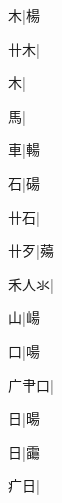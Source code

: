 \begin{multicols}{2}
{{\cjk{}{\cnsym{}　}{\cnsym{}　}木}|{\cjk{}楊}\par
{\cjk{}{\cnsym{}　}卄木}|{}\par
{木}|{}\par
{\cjk{}{\cnsym{}　}{\cnsym{}　}馬}|{}\par
{\cjk{}{\cnsym{}　}{\cnsym{}　}車}|{\cjk{}輰}\par
{\cjk{}{\cnsym{}　}{\cnsym{}　}石}|{\cjk{}碭}\par
{\cjk{}{\cnsym{}　}卄石}|{}\par
{\cjk{}{\cnsym{}　}卄歹}|{\cjk{}薚}\par
{\cjk{}禾人氺}|{}\par
{\cjk{}{\cnsym{}　}{\cnsym{}　}山}|{\cjk{}崵}\par
{\cjk{}{\cnsym{}　}{\cnsym{}　}口}|{\cjk{}啺}\par
{\cjk{}广肀口}|{}\par
{\cjk{}{\cnsym{}　}{\cnsym{}　}日}|{\cjk{}暘}\par
{日}|{\cjk{}霷}\par
{\cjk{}{\cnsym{}　}疒日}|{}\par
}
\end{multicols}
